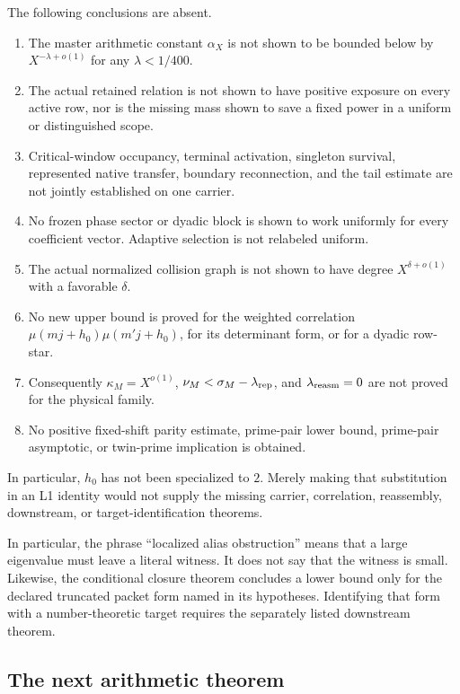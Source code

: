 The following conclusions are absent.
\begin{enumerate}[leftmargin=2.3em]
 \item The master arithmetic constant \(\alpha_X\) is not shown to be
       bounded below by \(X^{-\lambda+o(1)}\) for any
       \(\lambda<1/400\).
 \item The actual retained relation is not shown to have positive exposure
       on every active row, nor is the missing mass shown to save a fixed
       power in a uniform or distinguished scope.
 \item Critical-window occupancy, terminal activation, singleton survival,
       represented native transfer, boundary reconnection, and the tail
       estimate are not jointly established on one carrier.
 \item No frozen phase sector or dyadic block is shown to work uniformly for
       every coefficient vector.  Adaptive selection is not relabeled
       uniform.
 \item The actual normalized collision graph is not shown to have degree
       \(X^{\delta+o(1)}\) with a favorable \(\delta\).
 \item No new upper bound is proved for the weighted correlation
       \(\mu(mj+h_0)\mu(m'j+h_0)\), for its determinant form, or for a
       dyadic row-star.
 \item Consequently \(\kappa_M=X^{o(1)}\),
       \(\nu_M<\sigma_M-\lambda_{\rm rep}\), and
       \(\lambda_{\rm reasm}=0\) are not proved for the physical family.
 \item No positive fixed-shift parity estimate, prime-pair lower bound,
       prime-pair asymptotic, or twin-prime implication is obtained.
\end{enumerate}

In particular, \(h_0\) has not been specialized to \(2\).  Merely making
that substitution in an L1 identity would not supply the missing carrier,
correlation, reassembly, downstream, or target-identification theorems.

In particular, the phrase ``localized alias obstruction'' means that a
large eigenvalue must leave a literal witness.  It does not say that the
witness is small.  Likewise, the conditional closure theorem concludes a
lower bound only for the declared truncated packet form named in its
hypotheses.  Identifying that form with a number-theoretic target requires
the separately listed downstream theorem.

\subsection{The next arithmetic theorem}

